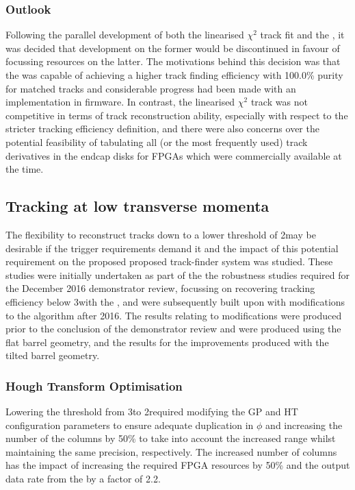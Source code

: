 \subsubsection{Outlook}\label{subsubsec:chi2outlook}
Following the parallel development of both the linearised $\chi^{2}$ track fit and the \KF, it was decided that development on the former would be discontinued in favour of focussing resources on the latter.
The motivations behind this decision was that the \KF was capable of achieving a higher track finding efficiency with 100.0\% purity for matched tracks and considerable progress had been made with an implementation in firmware.
In contrast, the linearised $\chi^{2}$ track was not competitive in terms of track reconstruction ability, especially with respect to the stricter tracking efficiency definition, and there were also concerns over the potential feasibility of tabulating all (or the most frequently used) track derivatives in the endcap disks for FPGAs which were commercially available at the time.

\subsection{Tracking at low transverse momenta}\label{subsec:Tmtt2GeV}
The flexibility to reconstruct tracks down to a lower \pT threshold of 2\GeV may be desirable if the trigger requirements demand it and the impact of this potential requirement on the proposed proposed track-finder system was studied.
These studies were initially undertaken as part of the the robustness studies required for the December 2016 demonstrator review, focussing on recovering tracking efficiency below 3\GeV with the \HT, and were subsequently built upon with modifications to the \KF algorithm after 2016.
The results relating to \HT modifications were produced prior to the conclusion of the demonstrator review and were produced using the flat barrel geometry, and the results for the \KF improvements produced with the tilted barrel geometry.

\subsubsection{Hough Transform Optimisation}\label{subsubsec:lowPtOptHT}
Lowering the \HT \pT threshold from 3\GeV to 2\GeV required modifying the GP and HT configuration parameters to ensure adequate duplication in $\phi$ and increasing the number of the \qpt columns by 50\% to take into account the increased \pt range whilst maintaining the same precision, respectively.
The increased number of \qpt columns has the impact of increasing the required FPGA resources by 50\% and the output data rate from the \HT by a factor of 2.2.

